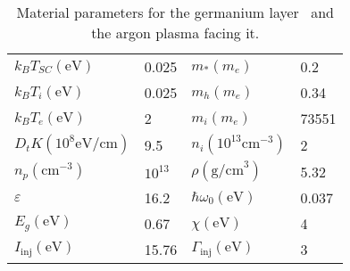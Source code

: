 \documentclass[pre,reprint,floats]{revtex4-1}
\begin{document}
\begin{table}
\setlength\extrarowheight{3pt}
\caption{Material parameters for the germanium layer~\cite{JR83} and the argon plasma facing it.
}
\label{tab:parameters}
\begin{ruledtabular}
	\begin{tabular}{llll}
$k_B T_{SC} (\text{eV})$    &	0.025	  &   $m_{*}(m_e)$	                 &  0.2   \\
$k_B T_{i} (\text{eV})$	    &	0.025  	  &   $m_h (m_e)$	                 &  0.34  \\
$k_B T_{e} (\text{eV})$	    &	2         &   $m_i(m_e)$	                 &  73551 \\
$D_tK (10^8\textrm{eV/cm})$ &	9.5	  &   $n_i (10^{13}\textrm{cm}^{-3})$    &  2	  \\
$n_p (\textrm{cm}^{-3})$    &	$10^{13}$ &   $\rho(\textrm{g/cm}^{3})$	         &  5.32  \\
$\varepsilon$	   	    &	16.2	  &   $\hbar\omega_0(\text{eV})$         &  0.037 \\
$E_g(\text{eV})$	    &	0.67	  &   $\chi (\textrm{eV})$	         &  4	  \\
$I_\textrm{inj}(\text{eV})$ &	15.76	  &   $\Gamma_\mathrm{inj} (\textrm{eV})$ &  3	
		\end{tabular}
	\end{ruledtabular}
\end{table}
\end{document}
